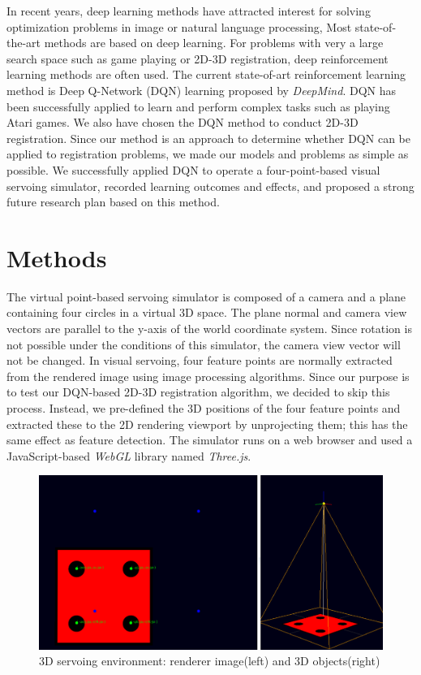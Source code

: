 \documentclass[10pt]{article}
\begin{document}
 In recent years, deep learning methods have attracted interest for solving optimization problems in image or natural language processing, Most state-of-the-art methods are based on deep learning\cite{deepimage, deeplanguage}. For problems with very a large search space such as game playing or 2D-3D registration, deep reinforcement learning methods are often used. The current state-of-art reinforcement learning method is Deep Q-Network (DQN)\cite{dqn} learning proposed by \emph{DeepMind}. DQN has been successfully applied to learn and perform complex tasks such as playing Atari games\cite{ref2}. We also have chosen the DQN method to conduct 2D-3D registration. Since our method is an approach to determine whether DQN can be applied to registration problems, we made our models and problems as simple as possible. We successfully applied DQN to operate a four-point-based visual servoing simulator, recorded learning outcomes and effects, and proposed a strong future research plan based on this method.

\section{Methods}
The virtual point-based servoing simulator is composed of a camera and a plane containing four circles in a virtual 3D space. The plane normal and camera view vectors are parallel to the y-axis of the world coordinate system. Since rotation is not possible under the conditions of this simulator, the camera view vector will not be changed. In visual servoing, four feature points are normally extracted from the rendered image using image processing algorithms. Since our purpose is to test our DQN-based 2D-3D registration algorithm, we decided to skip this process. Instead, we pre-defined the 3D positions of the four feature points and extracted these to the 2D rendering viewport by unprojecting them; this has the same effect as feature detection. The simulator runs on a web browser and used a JavaScript-based \emph{WebGL} library named \emph{Three.js}.

\begin{figure}[htb]
\begin{center}
\includegraphics[width=0.8\columnwidth]{images/fig-temp1.png}
\caption{3D servoing environment: renderer image(left) and 3D objects(right)}
\label{fig1}
\end{center}
\end{figure}
\end{document}

